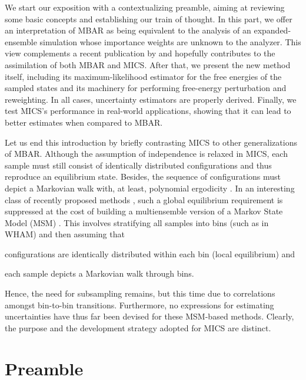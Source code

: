 \documentclass[journal=jctcce,manuscript=article,layout=twocolumn]{achemso}
\begin{document}
We start our exposition with a contextualizing preamble, aiming at reviewing some basic concepts and establishing our train of thought. In this part, we offer an interpretation of MBAR as being equivalent to the analysis of an expanded-ensemble simulation \cite{Lyubartsev_1992} whose importance weights are unknown to the analyzer. This view complements a recent publication by \citeauthor{Shirts_2017} \cite{Shirts_2017} and hopefully contributes to the assimilation of both MBAR and MICS. After that, we present the new method itself, including its maximum-likelihood estimator for the free energies of the sampled states and its machinery for performing free-energy perturbation and reweighting. In all cases,  uncertainty estimators are properly derived. Finally, we test MICS's performance in real-world applications, showing that it can lead to better estimates when compared to MBAR.

Let us end this introduction by briefly contrasting MICS to other generalizations of MBAR. Although the assumption of independence is relaxed in MICS, each sample must still consist of identically distributed configurations and thus reproduce an equilibrium state. Besides, the sequence of configurations must depict a Markovian walk with, at least, polynomial ergodicity \cite{Roy_2018}. In an interesting class of recently proposed methods \cite{Mey_2014, Wu_2014, Rosta_2015, Wu_2016}, such a global equilibrium requirement is suppressed at the cost of building a multiensemble version \cite{Wu_2016} of a Markov State Model (MSM) \cite{Pande_2010, Husic_2018}. This involves stratifying all samples into bins (such as in WHAM) and then assuming that \begin{enumerate*}[label = \arabic*)] \item configurations are identically distributed within each bin (local equilibrium) and \item each sample depicts a Markovian walk through bins.\end{enumerate*} Hence, the need for subsampling remains, but this time due to correlations amongst bin-to-bin transitions. Furthermore, no expressions for estimating uncertainties have thus far been devised for these MSM-based methods. Clearly, the purpose and the development strategy adopted for MICS are distinct.

\section{Preamble}
\end{document}
